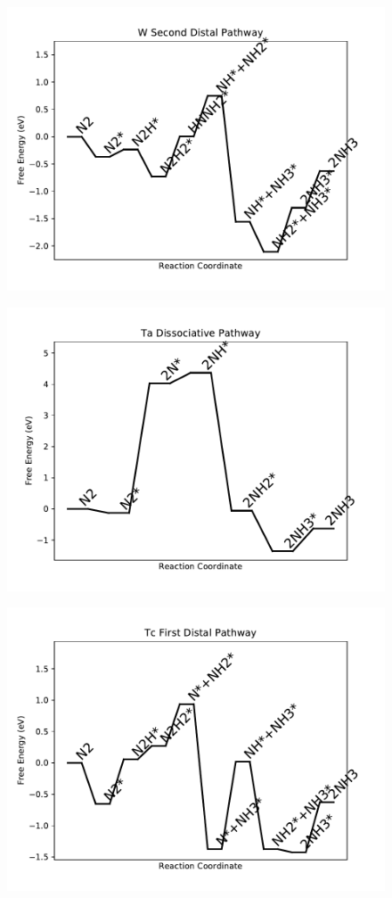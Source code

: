 \begin{figure}
\includegraphics[width=0.8\linewidth]{data/plots/W_distal_2.pdf}
\end{figure}

\begin{figure}
\includegraphics[width=0.8\linewidth]{data/plots/Ta_dissociative.pdf}
\end{figure}

\begin{figure}
\includegraphics[width=0.8\linewidth]{data/plots/Tc_distal_1.pdf}
\end{figure}

